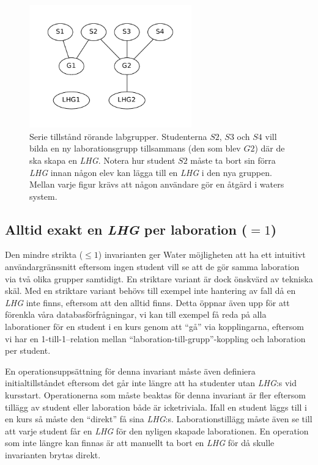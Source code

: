 \begin{figure}
  \includegraphics[width=7.0cm]{fig/labgroup/slack_add_5.pdf}        
  \caption[Serie tillstånd rörande labgrupper.]
  {Serie tillstånd rörande labgrupper. Studenterna $S2$, $S3$ och $S4$ vill
  bilda en ny laborationsgrupp tillsammans (den som blev $G2$) där de ska skapa
  en \emph{LHG}. Notera hur student $S2$ måste ta bort sin förra \emph{LHG} innan någon elev
  kan lägga till en \emph{LHG} i den nya gruppen. Mellan varje figur krävs att någon
  användare gör en åtgärd i waters system.}
  \label{fig:slack_series}
  
\end{figure}

\subsection{Alltid exakt en \emph{LHG} per laboration ($= 1$)}
Den mindre strikta ($\leq 1$) invarianten ger Water möjligheten att ha ett intuitivt användargränssnitt eftersom ingen student vill se att de gör samma laboration via två olika grupper samtidigt. En striktare variant är dock önskvärd av tekniska skäl. Med en striktare variant behövs till exempel inte hantering av fall då en \emph{LHG} inte finns, eftersom att den alltid finns. Detta öppnar även upp för att förenkla våra databasförfrågningar, vi kan till exempel få reda på alla laborationer för en student i en kurs genom att “gå” via kopplingarna, eftersom vi har en 1-till-1–relation mellan “laboration-till-grupp”-koppling och laboration per student.

En operationsuppsättning för denna invariant måste även definiera initialtillståndet eftersom det går inte längre att ha studenter utan \emph{LHG}:s vid kursstart. Operationerna som måste beaktas för denna invariant är fler eftersom tillägg av student eller laboration både är icketriviala. Ifall en student läggs till i en kurs så måste den “direkt” få sina \emph{LHG}:s. Laborationstillägg måste även se till att varje student får en \emph{LHG} för den nyligen skapade laborationen. En operation som inte längre kan finnas är att manuellt ta bort en \emph{LHG} för då skulle invarianten brytas direkt.

